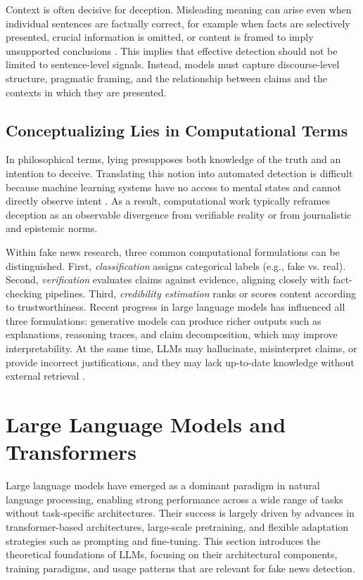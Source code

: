 Context is often decisive for deception. Misleading meaning can arise even when individual sentences are factually correct, for example when facts are selectively presented, crucial information is omitted, or content is framed to imply unsupported conclusions \cite{encyclopedia2010043}. This implies that effective detection should not be limited to sentence-level signals. Instead, models must capture discourse-level structure, pragmatic framing, and the relationship between claims and the contexts in which they are presented.

\subsection{Conceptualizing Lies in Computational Terms}

In philosophical terms, lying presupposes both knowledge of the truth and an intention to deceive. Translating this notion into automated detection is difficult because machine learning systems have no access to mental states and cannot directly observe intent \cite{encyclopedia2010043}. As a result, computational work typically reframes deception as an observable divergence from verifiable reality or from journalistic and epistemic norms.

Within fake news research, three common computational formulations can be distinguished. First, \emph{classification} assigns categorical labels (e.g., fake vs. real). Second, \emph{verification} evaluates claims against evidence, aligning closely with fact-checking pipelines. Third, \emph{credibility estimation} ranks or scores content according to trustworthiness. Recent progress in large language models has influenced all three formulations: generative models can produce richer outputs such as explanations, reasoning traces, and claim decomposition, which may improve interpretability. At the same time, LLMs may hallucinate, misinterpret claims, or provide incorrect justifications, and they may lack up-to-date knowledge without external retrieval \cite{vykopal2024generativelargelanguagemodels}.

\section{Large Language Models and Transformers}

Large language models have emerged as a dominant paradigm in natural language processing, enabling strong performance across a wide range of tasks without task-specific architectures. Their success is largely driven by advances in transformer-based architectures, large-scale pretraining, and flexible adaptation strategies such as prompting and fine-tuning. This section introduces the theoretical foundations of LLMs, focusing on their architectural components, training paradigms, and usage patterns that are relevant for fake news detection.

